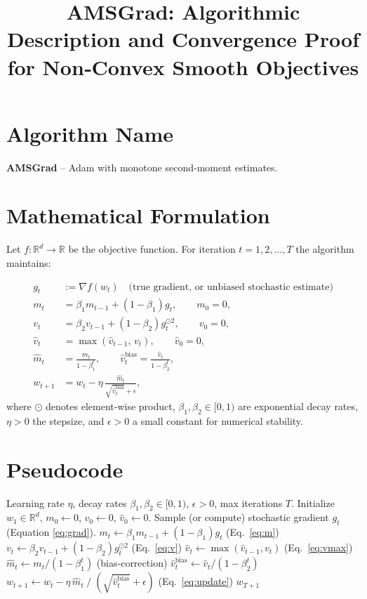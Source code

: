 \documentclass{article}
\title{AMSGrad: Algorithmic Description and Convergence Proof for Non‑Convex Smooth Objectives}
\author{}
\date{}
\newcommand{\R}{\mathbb{R}}
\begin{document}
\maketitle

\section*{Algorithm Name}
\textbf{AMSGrad} – Adam with monotone second‑moment estimates.

\section*{Mathematical Formulation}
Let $f:\R^{d}\rightarrow\R$ be the objective function.  
For iteration $t=1,2,\dots,T$ the algorithm maintains:

\begin{align}
g_t &:= \nabla f(w_t) \quad\text{(true gradient, or unbiased stochastic estimate)}\label{eq:grad}\\
m_t &= \beta_1 m_{t-1} + (1-\beta_1) g_t , \qquad m_0 =0,\label{eq:m}\\
v_t &= \beta_2 v_{t-1} + (1-\beta_2) g_t^{\odot 2}, \qquad v_0 =0,\label{eq:v}\\
\hat{v}_t &= \max (\hat{v}_{t-1},\, v_t),\qquad \hat{v}_0 =0,\label{eq:vmax}\\
\hat{m}_t &= \frac{m_t}{1-\beta_1^{t}},\qquad 
\hat{v}_t^{\text{bias}} = \frac{\hat{v}_t}{1-\beta_2^{t}},\label{eq:bias}\\
w_{t+1} &= w_t - \eta \,\frac{\hat{m}_t}{\sqrt{\hat{v}_t^{\text{bias}}}+\epsilon},\label{eq:update}
\end{align}
where $\odot$ denotes element‑wise product, $\beta_1,\beta_2\in[0,1)$ are exponential decay rates, $\eta>0$ the stepsize, and $\epsilon>0$ a small constant for numerical stability.

\section*{Pseudocode}
\begin{algorithm}[H]
\caption{AMSGrad}
\begin{algorithmic}[1]
\Require Learning rate $\eta$, decay rates $\beta_1,\beta_2\in[0,1)$, $\epsilon>0$, max iterations $T$.
\State Initialize $w_1\in\R^{d}$, $m_0\gets 0$, $v_0\gets 0$, $\hat{v}_0\gets 0$.
    \State Sample (or compute) stochastic gradient $g_t$ (Equation \eqref{eq:grad}).
    \State $m_t \gets \beta_1 m_{t-1} + (1-\beta_1) g_t$ \hfill (Eq.~\eqref{eq:m})
    \State $v_t \gets \beta_2 v_{t-1} + (1-\beta_2) g_t^{\odot 2}$ \hfill (Eq.~\eqref{eq:v})
    \State $\hat{v}_t \gets \max(\hat{v}_{t-1}, v_t)$ \hfill (Eq.~\eqref{eq:vmax})
    \State $\hat{m}_t \gets m_t/(1-\beta_1^{t})$ \hfill (bias‑correction)
    \State $\hat{v}_t^{\text{bias}} \gets \hat{v}_t/(1-\beta_2^{t})$
    \State $w_{t+1} \gets w_t - \eta\,\hat{m}_t\;/\;(\sqrt{\hat{v}_t^{\text{bias}}}+\epsilon)$ \hfill (Eq.~\eqref{eq:update})
\EndFor
\State \Return $w_{T+1}$
\end{algorithmic}
\end{algorithm}
\end{document}
